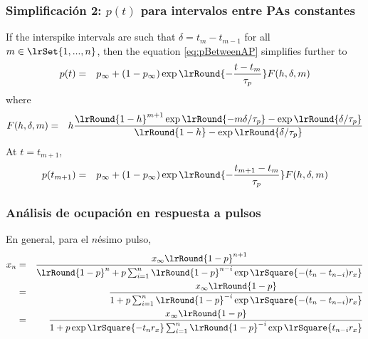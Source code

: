 \documentclass[8pt]{beamer}
\begin{document}
\begin{frame}
\frametitle{Simplificación 2: $p(t)$ para intervalos entre PAs constantes}
\begin{small}
If the interspike intervals are such that $\delta = t_{m} - t_{m-1}$
for all $m \in \lrSet{1,...,n}$, then  the equation \eqref{eq:pBetweenAP}
simplifies further to
\begin{eqnarray*}
p(t)
&=& 
p_{\infty} + (1-p_{\infty}) 
 \exp \lrRound{-\frac{t-t_{m}}{\tau_p}}
F(h,\delta,m)
\end{eqnarray*}
where 
\begin{eqnarray*}
F(h,\delta, m) 
&=& 
h 
\frac
{ \lrRound{1- h}^{m+1}
\exp \lrRound{- m \delta / \tau_p}
- {\exp \lrRound{  \delta / \tau_p}}
}
{\lrRound{1- h} - \exp \lrRound{ \delta / \tau_p}}
\end{eqnarray*}
At $t=t_{m+1}$, 
\begin{eqnarray*}
p(t_{m+1})
&=&
p_{\infty} + (1-p_{\infty}) 
 \exp \lrRound{-\frac{t_{m+1}-t_{m}}{\tau_p}}
F(h,\delta,m)
\end{eqnarray*}
\end{small}
\end{frame}


\begin{frame}
\frametitle{Análisis de ocupación en respuesta a pulsos}

En general, para el $n$ésimo pulso,
\begin{eqnarray}
x_n
&=& 
\frac{
x_{\infty} \lrRound{1-p}^{n+1} 
}
{
\lrRound{1-p}^{n} 
+ p
\sum_{i=1}^{n} \lrRound{1-p}^{n-i} \exp\lrSquare{- (t_n-t_{n-i}) r_x }
}
\label{tnOccup1}
\\
&=& 
\frac{
x_{\infty} \lrRound{1-p}
}{
1
+ p
\sum_{i=1}^{n} \lrRound{1-p}^{-i} \exp\lrSquare{- (t_n-t_{n-i}) r_x }
}
\label{tnOccup2}
\\
&=& 
\frac{
x_{\infty} \lrRound{1-p}
}{
1
+ p \exp\lrSquare{- t_n r_x}
\sum_{i=1}^{n} \lrRound{1-p}^{-i} \exp\lrSquare{t_{n-i} r_x }
}
\label{tnOccup3}
\end{eqnarray}
\end{frame}
\end{document}

